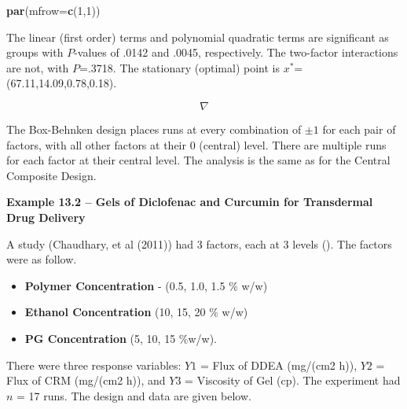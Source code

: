 \documentclass[
]{book}
\newenvironment{Shaded}{\begin{snugshade}}{\end{snugshade}}
\newcommand{\AttributeTok}[1]{\textcolor[rgb]{0.13,0.29,0.53}{#1}}
\newcommand{\DecValTok}[1]{\textcolor[rgb]{0.00,0.00,0.81}{#1}}
\newcommand{\FunctionTok}[1]{\textcolor[rgb]{0.13,0.29,0.53}{\textbf{#1}}}
\newcommand{\NormalTok}[1]{#1}
\providecommand{\tightlist}{%
  \setlength{\itemsep}{0pt}\setlength{\parskip}{0pt}}
\begin{document}
\begin{Shaded}
\begin{Highlighting}[]
\FunctionTok{par}\NormalTok{(}\AttributeTok{mfrow=}\FunctionTok{c}\NormalTok{(}\DecValTok{1}\NormalTok{,}\DecValTok{1}\NormalTok{))}
\end{Highlighting}
\end{Shaded}

The linear (first order) terms and polynomial quadratic terms are
significant as groups with \(P\)-values of .0142 and .0045,
respectively. The two-factor interactions are not, with \(P\)=.3718. The
stationary (optimal) point is \(x^*\)=(67.11,14.09,0.78,0.18).

\[\nabla \]

The Box-Behnken design places runs at every combination of \(\pm 1\) for
each pair of factors, with all other factors at their 0 (central) level.
There are multiple runs for each factor at their central level. The
analysis is the same as for the Central Composite Design.

\textbf{Example 13.2 -- Gels of Diclofenac and Curcumin for Transdermal
Drug Delivery}

A study (Chaudhary, et al (2011)) had 3 factors, each at 3 levels
(). The factors were
as follow.

\begin{itemize}
\tightlist
\item
  \textbf{Polymer Concentration} - (0.5, 1.0, 1.5 \% w/w)
\item
  \textbf{Ethanol Concentration} (10, 15, 20 \% w/w)
\item
  \textbf{PG Concentration} (5, 10, 15 \%w/w).
\end{itemize}

There were three response variables: \(Y1\) = Flux of DDEA (mg/(cm2 h)),
\(Y2\) = Flux of CRM (mg/(cm2 h)), and \(Y3\) = Viscosity of Gel (cp).
The experiment had \(n\) = 17 runs. The design and data are given below.
\end{document}
